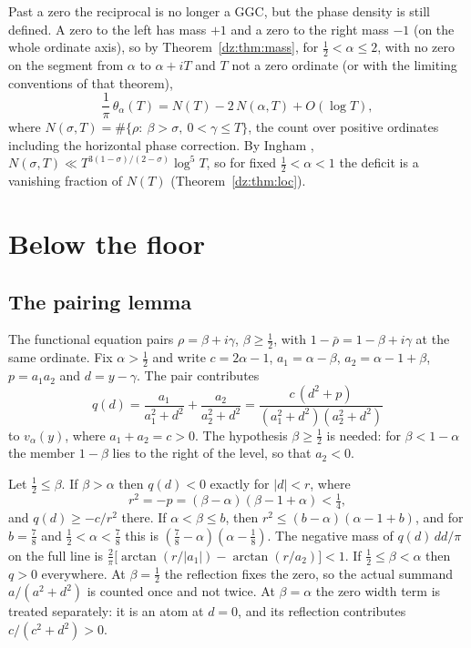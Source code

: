 Past a zero the reciprocal is no longer a GGC, but the phase density is still defined. A zero to the left has mass $+1$ and a zero to the right mass $-1$ (on the whole ordinate axis), so by Theorem~\ref{dz:thm:mass}, for $\frac12<\alpha\le2$, with no zero on the segment from $\alpha$ to $\alpha+iT$ and $T$ not a zero ordinate (or with the limiting conventions of that theorem),
\begin{equation}\label{qt:eq:mass}
\frac1\pi\,\theta_\alpha(T)=N(T)-2\,N(\alpha,T)+O(\log T),
\end{equation}
where $N(\sigma,T)=\#\{\rho:\ \beta>\sigma,\ 0<\gamma\le T\}$, the count over positive ordinates including the horizontal phase correction. By Ingham \cite{Ingham40}, $N(\sigma,T)\ll T^{3(1-\sigma)/(2-\sigma)}\log^5T$, so for fixed $\frac12<\alpha<1$ the deficit is a vanishing fraction of $N(T)$ (Theorem~\ref{dz:thm:loc}).

\section{Below the floor}\label{qt:sec:below}

\subsection{The pairing lemma}\label{qt:sec:pair}

The functional equation pairs $\rho=\beta+i\gamma$, $\beta\ge\frac12$, with $1-\bar\rho=1-\beta+i\gamma$ at the same ordinate. Fix $\alpha>\frac12$ and write $c=2\alpha-1$, $a_1=\alpha-\beta$, $a_2=\alpha-1+\beta$, $p=a_1a_2$ and $d=y-\gamma$. The pair contributes
\begin{equation}\label{qt:eq:pair}
q(d)=\frac{a_1}{a_1^2+d^2}+\frac{a_2}{a_2^2+d^2}=\frac{c\,(d^2+p)}{(a_1^2+d^2)(a_2^2+d^2)}
\end{equation}
to $v_\alpha(y)$, where $a_1+a_2=c>0$. The hypothesis $\beta\ge\frac12$ is needed: for $\beta<1-\alpha$ the member $1-\beta$ lies to the right of the level, so that $a_2<0$.

\begin{lemma}[pairing]\label{qt:lem:pair}
Let $\frac12\le\beta$. If $\beta>\alpha$ then $q(d)<0$ exactly for $|d|<r$, where
\[
r^2=-p=(\beta-\alpha)(\beta-1+\alpha)<\tfrac14 ,
\]
and $q(d)\ge-c/r^2$ there. If $\alpha<\beta\le b$, then $r^2\le(b-\alpha)(\alpha-1+b)$, and for $b=\frac78$ and $\frac12<\alpha<\frac78$ this is $(\frac78-\alpha)(\alpha-\frac18)$. The negative mass of $q(d)\,dd/\pi$ on the full line is $\frac2\pi\big[\arctan(r/|a_1|)-\arctan(r/a_2)\big]<1$. If $\frac12\le\beta<\alpha$ then $q>0$ everywhere. At $\beta=\frac12$ the reflection fixes the zero, so the actual summand $a/(a^2+d^2)$ is counted once and not twice. At $\beta=\alpha$ the zero width term is treated separately: it is an atom at $d=0$, and its reflection contributes $c/(c^2+d^2)>0$.
\end{lemma}

